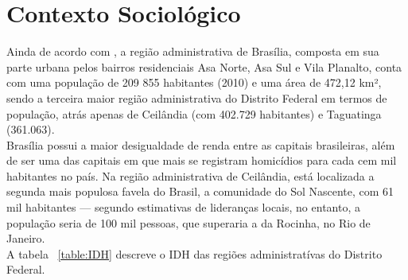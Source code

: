 \section{Contexto Sociológico}

Ainda de acordo com , a região administrativa de Brasília, composta em sua parte urbana pelos bairros residenciais Asa Norte, Asa Sul e Vila Planalto, conta com uma população de 209 855 habitantes (2010) e uma área de 472,12 km², sendo a terceira maior região administrativa do Distrito Federal em termos de população, atrás apenas de Ceilândia (com 402.729 habitantes) e Taguatinga (361.063).\\

Brasília possui a maior desigualdade de renda entre as capitais brasileiras, além de ser uma das capitais em que mais se registram homicídios para cada cem mil habitantes no país. Na região administrativa de Ceilândia, está localizada a segunda mais populosa favela do Brasil, a comunidade do Sol Nascente, com 61 mil habitantes — segundo estimativas de lideranças locais, no entanto, a população seria de 100 mil pessoas, que superaria a da Rocinha, no Rio de Janeiro.\\

A tabela ~\ref{table:IDH} descreve o IDH das regiões administratívas do Distrito Federal.\\

